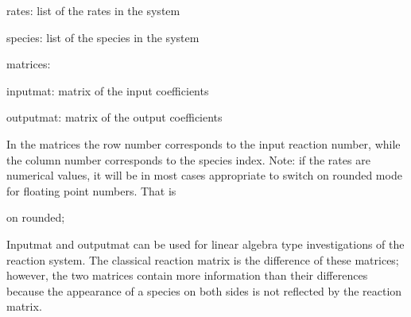  rates: list of the rates in the system

 species: list of the species in the system

 matrices:

 inputmat: matrix of the input coefficients

 outputmat: matrix of the output coefficients

In the matrices the row number corresponds to the input reaction 
number, while the column number corresponds to the species index.
Note: if the rates are numerical values, it will be in most cases
appropriate to switch on \REDUCE{} rounded mode for floating
point numbers. That is


on rounded;

Inputmat and outputmat can be used for linear algebra type 
investigations of the reaction system. The classical reaction 
matrix is the difference of these matrices; however, the two 
matrices contain more information than their differences because 
the appearance of a species on both sides is not reflected by 
the reaction matrix.

